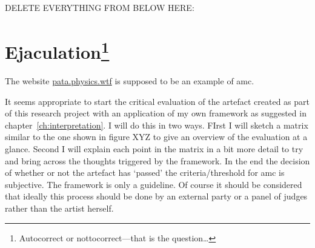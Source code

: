 DELETE EVERYTHING FROM BELOW HERE:

\section[Ejaculation]{Ejaculation\footnote{Autocorrect or nottocorrect---that is the question\ldots}}


The website \url{pata.physics.wtf} is supposed to be an example of \gls{amc}.

It seems appropriate to start the critical evaluation of the artefact created as part of this research project with an application of my own framework as suggested in chapter~\ref{ch:interpretation}. I will do this in two ways. FIrst I will sketch a matrix similar to the one shown in figure XYZ to give an overview of the evaluation at a glance. Second I will explain each point in the matrix in a bit more detail to try and bring across the thoughts triggered by the framework. In the end the decision of whether or not the artefact has `passed' the criteria/threshold for \gls{amc} is subjective. The framework is only a guideline. Of course it should be considered that ideally this process should be done by an external party or a panel of judges rather than the artist herself.

